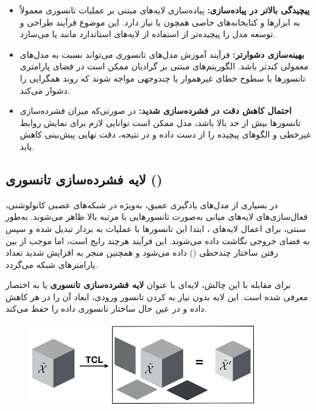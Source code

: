 \begin{itemize}
	\item \textbf{پیچیدگی بالاتر در پیاده‌سازی:} پیاده‌سازی لایه‌های مبتنی بر عملیات تانسوری معمولاً به ابزارها و کتابخانه‌های خاصی همچون  یا  نیاز دارد. این موضوع فرآیند طراحی و توسعه مدل را پیچیده‌تر از استفاده از لایه‌های استاندارد مانند  یا  می‌سازد.
	
	\item \textbf{بهینه‌سازی دشوارتر:} فرآیند آموزش مدل‌های تانسوری می‌تواند نسبت به مدل‌های معمولی کندتر باشد. الگوریتم‌های مبتنی بر گرادیان ممکن است در فضای پارامتری تانسورها با سطوح خطای غیرهموار یا چندوجهی مواجه شوند که روند همگرایی را دشوار می‌کند.
	
	\item \textbf{احتمال کاهش دقت در فشرده‌سازی شدید:} در صورتی‌که میزان فشرده‌سازی تانسورها بیش از حد بالا باشد، مدل ممکن است توانایی لازم برای نمایش روابط غیرخطی و الگوهای پیچیده را از دست داده و در نتیجه، دقت نهایی پیش‌بینی کاهش یابد.
\end{itemize}



\subsection{لایه فشرده‌سازی تانسوری ()}

در بسیاری از مدل‌های یادگیری عمیق، به‌ویژه در شبکه‌های عصبی کانولوشنی، فعال‌سازی‌های لایه‌های میانی به‌صورت تانسورهایی با مرتبه بالا ظاهر می‌شوند. به‌طور سنتی، برای اعمال لایه‌های ، ابتدا این تانسورها با عملیات  به بردار تبدیل شده و سپس به فضای خروجی نگاشت داده می‌شوند. این فرآیند هرچند رایج است، اما موجب از بین رفتن ساختار چندخطی () داده می‌شود و همچنین منجر به افزایش شدید تعداد پارامترهای شبکه می‌گردد.

برای مقابله با این چالش، لایه‌ای با عنوان \textbf{لایه فشرده‌سازی تانسوری} یا به اختصار  معرفی شده است. این لایه بدون نیاز به  کردن تانسور ورودی، ابعاد آن را در هر  کاهش داده و در عین حال ساختار تانسوری داده را حفظ می‌کند.


\begin{figure}[h]
	\centering
	\begin{minipage}[b]{0.7\textwidth}
		\centering
		\includegraphics[width=\textwidth]{transformer_images/tcl.png}
		\caption{}
		\label{fig:tensor_contraction_layer}
	\end{minipage}
	\hfill
\end{figure}




